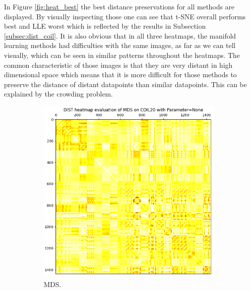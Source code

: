 In Figure \ref{fig:heat_best} the best distance preservations for all methods are displayed. By visually inspecting those one can see that t-SNE overall performs best and LLE worst which is reflected by the results in Subsection \ref{subsec:dist_coil}. It is also obvious that in all three heatmaps, the manifold learning methods had difficulties with the same images, as far as we can tell visually, which can be seen in similar patterns throughout the heatmaps. The common characteristic of those images is that they are very distant in high dimensional space which means that it is more difficult for those methods to preserve the distance of distant datapoints than similar datapoints. This can be explained by the crowding problem.

\begin{figure}[!]
     \centering
     \begin{subfigure}[t]{0.32\columnwidth}
    	\centering
    	\includegraphics[width=\columnwidth]{images/dist_heatmap_mds_coil20_None.png}
    	\caption{MDS.}
        \label{fig:dist_heatmap_mds_coil20_None}
    \end{subfigure}
     \hfill
     \begin{subfigure}[t]{0.32\columnwidth}
    	\centering

\end{subfigure}
\end{figure}
